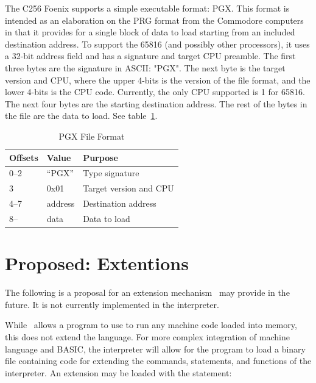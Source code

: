 \documentclass{report}
\begin{document}
    The C256 Foenix supports a simple executable format: PGX.
    This format is intended as an elaboration on the PRG format from the Commodore computers
    in that it provides for a single block of data to load starting from an included destination
    address. To support the 65816 (and possibly other processors), it uses a 32-bit address field and
    has a signature and target CPU preamble. The first three bytes are the signature in ASCII: "PGX".
    The next byte is the target version and CPU, where the upper 4-bits is the version of the file format, 
    and the lower 4-bits is the CPU code. Currently, the only CPU supported is 1 for 65816.
    The next four bytes are the starting destination address. The rest of the bytes in the file are the
    data to load. See table~\ref{pgx}.

    \begin{table}[!htb]
        \begin{center}
            \begin{tabular}{|l|l|l|} \hline
                Offsets & Value &  Purpose \\ \hline\hline
                0--2 & ``PGX'' & Type signature \\ \hline
                3 & 0x01 & Target version and CPU \\ \hline
                4--7 & address & Destination address \\ \hline
                8-- & data & Data to load \\ \hline
            \end{tabular}
        \end{center}
        \caption{PGX File Format}
        \label{pgx}
    \end{table}

    \section*{Proposed: Extentions}

    The following is a proposal for an extension mechanism \BASIC\ may provide in the future.
    It is not currently implemented in the interpreter.

    While \BASIC\ allows a program to use  to run any machine code loaded into memory,
    this does not extend the language.
    For more complex integration of machine language and BASIC, the interpreter will allow for
    the program to load a binary file containing code for extending the commands, statements,
    and functions of the interpreter. An extension may be loaded with the statement:
\end{document}
